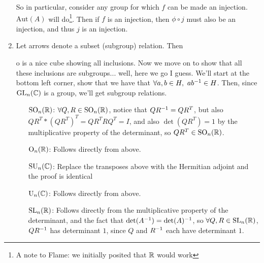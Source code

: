 \documentclass[12pt, twosided]{article}
\begin{document}
\begin{enumerate}
  \begin{center}
  \end{center}
  So in particular, consider any group for which \(f\) can be made an injection. \(\mathrm{Aut}(A)\) will do\footnote{A note to Flame: we initially posited that \(\mathbb{R}\) would work}. Then if \(f\) is an injection, then \(\phi \circ j\) must also be an injection, and thus \(j\) is an injection.
\item Let arrows denote a subset (subgroup) relation. Then
  \begin{center}
  \end{center}
o  is a nice cube showing all inclusions. Now we move on to show that all these inclusions are subgroups... well, here we go I guess. We'll start at the bottom left corner, show that we have that \(\forall a, b \in H,\ ab^{-1} \in H\). Then, since \(\mathrm{GL}_n(\mathbb{C})\) is a group, we'll get subgroup relations.
  \begin{itemize}
  \item [\(\mathrm{SO}_n(\mathbb{R})\):] \(\forall Q, R \in \mathrm{SO}_n(\mathbb{R})\), notice that \(QR^{-1} = QR^T\), but also \(QR^T*(QR^T)^T = QR^TRQ^T = I\), and also \(\det(QR^T) = 1\) by the multiplicative property of the determinant, so \(QR^T \in \mathrm{SO}_n(\mathbb{R})\).
  \item [\(\mathrm{O}_n(\mathbb{R})\):] Follows directly from above.
  \item [\(\mathrm{SU}_n(\mathbb{C})\):] Replace the transposes above with the Hermitian adjoint and the proof is identical
  \item [\(\mathrm{U}_n(\mathbb{C})\):] Follows directly from above.
  \item [\(\mathrm{SL}_n(\mathbb{R})\):] Follows directly from the multiplicative property of the determinant, and the fact that \(\det(A^{-1}) = \det(A)^{-1}\), so \(\forall Q,R \in \mathrm{SL}_n(\mathbb{R})\), \(QR^{-1}\) has determinant \(1\), since \(Q\) and \(R^{-1}\) each have determinant \(1\).

\end{itemize}
\end{enumerate}
\end{document}
